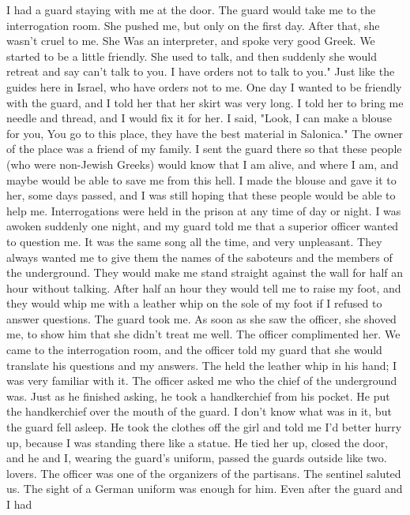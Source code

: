 I had a guard staying with me at 
the door.
The guard would take me to the interrogation room.
She pushed 
me, but only on the first day.
After that, she wasn't cruel to me.
She 
Was an interpreter, and spoke very good Greek.
We started to be a little 
friendly.
She used to talk, and then suddenly she would retreat and say
can't talk to you.
I have orders not to talk to you."
Just like the guides here 
in Israel, who have orders not to me.
One day I wanted to be friendly with the guard, and I told her that 
her skirt was very long.
I told her to bring me needle and thread, and 
I would fix it for her.
I said, "Look, I can make a blouse for you, 
You go to this place, they have the best material in Salonica."
The owner 
of the place was a friend of my family.
I sent the guard there so 
that these people (who were non-Jewish Greeks) would know that I am alive, 
and where I am, and maybe would be able to save me from this hell.
I made the blouse and gave it to her, some days passed, and I was 
still hoping that these people would be able to help me.
Interrogations 
were held in the prison at any time of day or night.
I was awoken 
suddenly one night, and my guard told me that a superior officer wanted 
to question me.
It was the same song all the time, and very unpleasant.
They always wanted me to give them the names of the saboteurs and the 
members of the underground.
They would make me stand straight against 
the wall for half an hour without talking.
After half an hour they 
would tell me to raise my foot, and they would whip me with a leather 
whip on the sole of my foot if I refused to answer questions.
The guard took me.
As soon as she saw the officer, she shoved me, 
to show him that she didn't treat me well.
The officer complimented her.
We came to the interrogation room, and the officer told my guard that 
she would translate his questions and my answers.
The held the 
leather whip in his hand; I was very familiar with it.
The officer asked 
me who the chief of the underground was.
Just as he finished asking, 
he took a handkerchief from his pocket.
He put the handkerchief 
over the mouth of the guard.
I don't know what was in it, but the 
guard fell asleep.
He took the clothes off the girl and told me I'd 
better hurry up, because I was standing there like a statue.
He tied
her up, closed the door, and he and I, wearing the guard's uniform, 
passed the guards outside like two.
lovers.
The officer was one of the 
organizers of the partisans.
The sentinel saluted us.
The sight of a 
German uniform was enough for him.
Even after the guard and I had 
